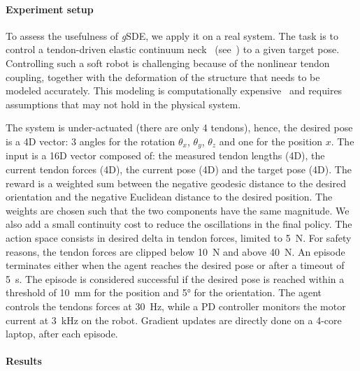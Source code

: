 \documentclass{article}
\newcommand{\qty}{\SI}
\newcommand{\ourSDE}{\textit{g}\textsc{SDE}\xspace}
\begin{document}
\paragraph{Experiment setup}

To assess the usefulness of \ourSDE, we apply it on a real system. The task is to control a tendon-driven elastic continuum neck~\citep{reinecke2016structurally} (see~) to a given target pose. Controlling such a soft robot is challenging because of the nonlinear tendon coupling, together with the deformation of the structure that needs to be modeled accurately. This modeling is computationally expensive~\citep{deutschmann2017position, deutschmann2019six} and requires assumptions that may not hold in the physical system.

The system is under-actuated (there are only 4 tendons), hence, the desired pose is a 4D vector: 3 angles for the rotation $\theta_x$, $\theta_y$, $\theta_z$ and one for the position $x$. The input is a 16D vector composed of: the measured tendon lengths (4D), the current tendon forces (4D), the current pose (4D) and the target pose (4D). The reward is a weighted sum between the negative geodesic distance to the desired orientation and the negative Euclidean distance to the desired position. The weights are chosen such that the two components have the same magnitude. We also add a small continuity cost to reduce the oscillations in the final policy.
The action space consists in desired delta in tendon forces, limited to \qty{5}{\newton}. For safety reasons, the tendon forces are clipped below \qty{10}{\newton} and above \qty{40}{\newton}.
An episode terminates either when the agent reaches the desired pose or after a timeout of \qty{5}{\second}.
The episode is considered successful if the desired pose is reached within a threshold of \qty{10}{\mm} for the position and \ang{5} for the orientation.
The agent controls the tendons forces at \qty{30}{\hertz}, while a PD controller monitors the motor current at \qty{3}{\kilo\hertz} on the robot. Gradient updates are directly done on a 4-core laptop, after each episode.

\paragraph{Results}
\end{document}
